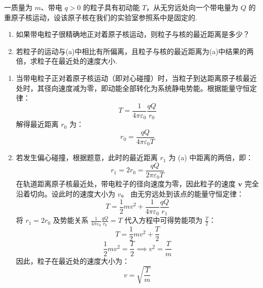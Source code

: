 \begin{exercise}\label{ex:15.7}
一质量为 $m$、带电 $q>0$ 的粒子具有初动能 $T$，从无穷远处向一个带电量为 $Q$ 的重原子核运动，设该原子核在我们的实验室参照系中是固定的.
\begin{enumerate}
  \item[(a)] 如果带电粒子很精确地正对着原子核运动，则粒子与核的最近距离是多少？
  \item[(b)] 若粒子的运动与(a)中相比有所偏离，且粒子与核的最近距离为(a)中结果的两倍，求粒子在最近处的速度大小.
\end{enumerate}
\end{exercise}
\begin{solution}
\begin{enumerate}
  \item[(a)] 当带电粒子正对着原子核运动（即对心碰撞）时，当粒子到达距离原子核最近处时，其径向速度减为零，即动能全部转化为系统静电势能。根据能量守恒定律：
  $$ T = \frac{1}{4\pi\varepsilon_0} \frac{qQ}{r_0} $$
  解得最近距离 $r_0$ 为：
  $$ r_0 = \frac{qQ}{4\pi\varepsilon_0 T} $$

  \item[(b)] 若发生偏心碰撞，根据题意，此时的最近距离 $r_1$ 为 (a) 中距离的两倍，即：
  $$ r_1 = 2r_0 = \frac{qQ}{2\pi\varepsilon_0 T} $$
  在轨道距离原子核最近处，带电粒子的径向速度为零，因此粒子的速度 $\boldsymbol{v}$ 完全沿着切向。设此时的速度大小为 $v$。
  由无穷远处到该点的能量守恒定律：
  $$ T = \frac{1}{2} m v^2 + \frac{1}{4\pi\varepsilon_0} \frac{qQ}{r_1} $$
  将 $r_1 = 2r_0$ 及势能关系 $\frac{1}{4\pi\varepsilon_0} \frac{qQ}{r_0} = T$ 代入方程中可得势能项为 $\frac{T}{2}$：
  $$ T = \frac{1}{2} m v^2 + \frac{T}{2} $$
  $$ \frac{1}{2} m v^2 = \frac{T}{2} \implies v^2 = \frac{T}{m} $$
  因此，粒子在最近处的速度大小为：
  $$ v = \sqrt{\frac{T}{m}} $$
\end{enumerate}
\end{solution}

